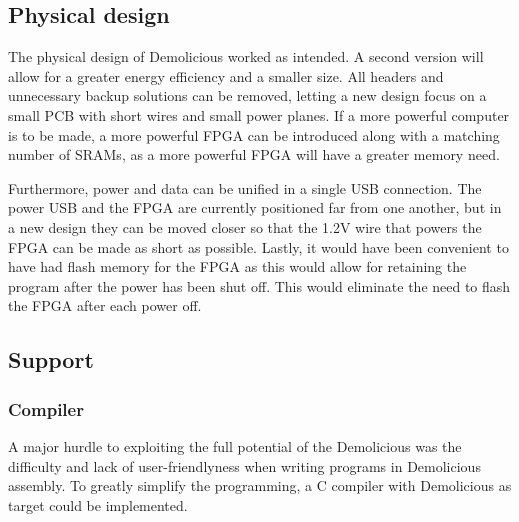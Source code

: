\documentclass[../main/report.tex]{subfiles}
\begin{document}
\subsection{Physical design}
The physical design of Demolicious worked as intended.
A second version will allow for a greater energy efficiency and a smaller size.
All headers and unnecessary backup solutions can be removed, letting a new design focus on a small PCB with short wires and small power planes.
If a more powerful computer is to be made, a more powerful FPGA can be introduced along with a matching number of SRAMs, as a more powerful FPGA will have a greater memory need.

Furthermore, power and data can be unified in a single USB connection.
The power USB and the FPGA are currently positioned far from one another, but in a new design they can be moved closer so that the 1.2V wire that powers the FPGA can be made as short as possible.
Lastly, it would have been convenient to have had flash memory for the FPGA as this would allow for retaining the program after the power has been shut off.
This would eliminate the need to flash the FPGA after each power off.

\subsection{Support}
\subsubsection*{Compiler}
A major hurdle to exploiting the full potential of the Demolicious was the difficulty and lack of user-friendlyness when writing programs in Demolicious assembly.
To greatly simplify the programming, a C compiler with Demolicious as target could be implemented.
\end{document}

